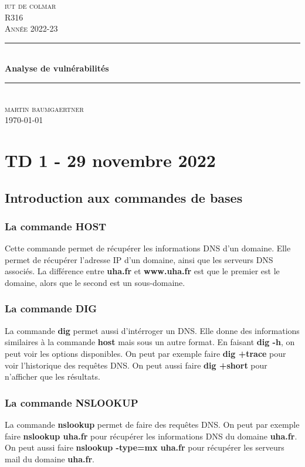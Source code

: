 \documentclass[12pt, a4paper]{article}
\begin{document}
\begin{titlepage}
	\newcommand{\HRule}{\rule{\linewidth}{0.5mm}} 
	\center 
	\textsc{\LARGE iut de colmar}\\[6.5cm] 
	\textsc{\Large R316}\\[0.5cm] 
	\textsc{\large Année 2022-23}\\[0.5cm]
	\HRule\\[0.75cm]
	{\huge\bfseries Analyse de vulnérabilités}\\[0.4cm]
	\HRule\\[1.5cm]
	\textsc{\large martin baumgaertner}\\[6.5cm] 

	\vfill\vfill\vfill
	{\large\today} 
	\vfill
\end{titlepage}
\newpage
\tableofcontents
\listoflistings
\newpage
\section{TD 1 - 29 novembre 2022}
\subsection{Introduction aux commandes de bases}
\subsubsection{La commande HOST}
Cette commande permet de récupérer les informations DNS d'un domaine. 
Elle permet de récupérer l'adresse IP d'un domaine, ainsi que les serveurs
DNS associés. La différence entre \textbf{uha.fr} et \textbf{www.uha.fr} est
que le premier est le domaine, alors que le second est un sous-domaine.

\subsubsection{La commande DIG}
La commande \textbf{dig} permet aussi d'intérroger un DNS. Elle donne des informations similaires
à la commande \textbf{host} mais sous un autre format. En faisant \textbf{dig -h}, on peut voir
les options disponibles. On peut par exemple faire \textbf{dig +trace} pour voir
l'historique des requêtes DNS. On peut aussi faire \textbf{dig +short} pour n'afficher
que les résultats. 

\subsubsection{La commande NSLOOKUP}
La commande \textbf{nslookup} permet de faire des requêtes DNS. On peut par exemple
faire \textbf{nslookup uha.fr} pour récupérer les informations DNS du domaine \textbf{uha.fr}.
On peut aussi faire \textbf{nslookup -type=mx uha.fr} pour récupérer les serveurs
mail du domaine \textbf{uha.fr}.
\end{document}
